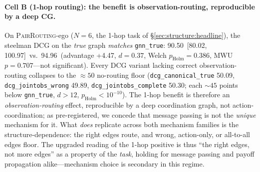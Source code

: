 \documentclass[10pt]{article}
\makeatletter
\newcommand{\gtrue}{\texttt{gnn\_true}}
\newcommand{\pairrouting}{\textsc{PairRouting}}
\newcommand{\SCfloor}{50}             %
\newcommand{\SCkTrue}{94.96}          %
\newcommand{\CBBdcgtrue}{90.50}        %
\newcommand{\CBBdcgtrueCI}{[80.02, 100.97]}
\newcommand{\CBBcanon}{50.09}          %
\newcommand{\CBBwrong}{49.89}          %
\newcommand{\CBBcomplete}{50.30}       %
\newcommand{\CBBgnnDcgGap}{+4.47}      %
\makeatother
\begin{document}
\paragraph{Cell B (1-hop routing): the benefit is observation-routing,
reproducible by a deep CG.} On \pairrouting-ego ($N{=}6$, the 1-hop task of
\S\ref{sec:structure:headline}), the steelman DCG on the \emph{true} graph
\emph{matches} \gtrue: \CBBdcgtrue\ \CBBdcgtrueCI\ vs.\ \SCkTrue\ (advantage
\CBBgnnDcgGap, $d{=}0.37$, Welch $p_{\text{Holm}}{=}0.386$, MWU
$p{=}0.707$---not significant). Every DCG variant lacking correct
observation-routing collapses to the ${\approx}\SCfloor$ no-routing floor
(\texttt{dcg\_canonical\_true} \CBBcanon, \texttt{dcg\_jointobs\_wrong}
\CBBwrong, \texttt{dcg\_jointobs\_complete} \CBBcomplete; each ${\sim}45$ points
below \gtrue, $d{>}12$, $p_{\text{Holm}}{<}10^{-10}$). The 1-hop benefit is
therefore an \emph{observation-routing} effect, reproducible by a deep
coordination graph, not action-coordination; as pre-registered, we concede that
message passing is not the \emph{unique} mechanism for it. What \emph{does}
replicate across both mechanism families is the structure-dependence: the right
edges route, and wrong, action-only, or all-to-all edges floor. The upgraded
reading of the 1-hop positive is thus ``the right edges, not more edges'' as a
property of the \emph{task}, holding for message passing and payoff propagation
alike---mechanism choice is secondary in this regime.
\end{document}
